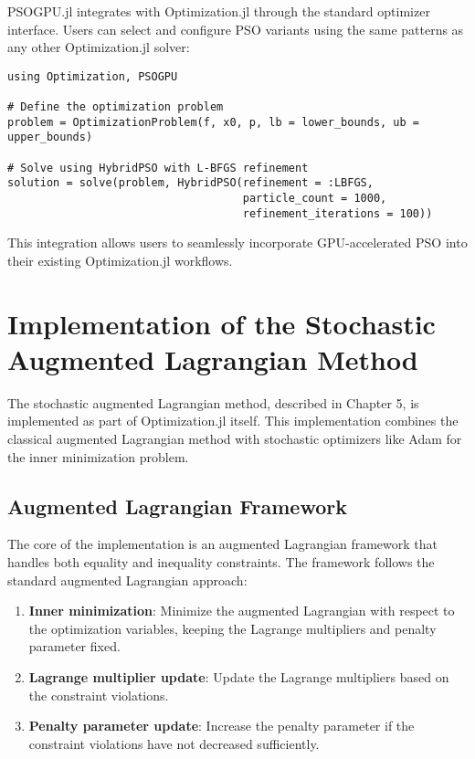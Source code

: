 PSOGPU.jl integrates with Optimization.jl through the standard optimizer interface. Users can select and configure PSO variants using the same patterns as any other Optimization.jl solver:

\begin{verbatim}
using Optimization, PSOGPU

# Define the optimization problem
problem = OptimizationProblem(f, x0, p, lb = lower_bounds, ub = upper_bounds)

# Solve using HybridPSO with L-BFGS refinement
solution = solve(problem, HybridPSO(refinement = :LBFGS, 
                                    particle_count = 1000, 
                                    refinement_iterations = 100))
\end{verbatim}

This integration allows users to seamlessly incorporate GPU-accelerated PSO into their existing Optimization.jl workflows.

\section{Implementation of the Stochastic Augmented Lagrangian Method}

The stochastic augmented Lagrangian method, described in Chapter 5, is implemented as part of Optimization.jl itself. This implementation combines the classical augmented Lagrangian method with stochastic optimizers like Adam for the inner minimization problem.

\subsection{Augmented Lagrangian Framework}

The core of the implementation is an augmented Lagrangian framework that handles both equality and inequality constraints. The framework follows the standard augmented Lagrangian approach:

\begin{enumerate}
\item \textbf{Inner minimization}: Minimize the augmented Lagrangian with respect to the optimization variables, keeping the Lagrange multipliers and penalty parameter fixed.

\item \textbf{Lagrange multiplier update}: Update the Lagrange multipliers based on the constraint violations.

\item \textbf{Penalty parameter update}: Increase the penalty parameter if the constraint violations have not decreased sufficiently.
\end{enumerate}


